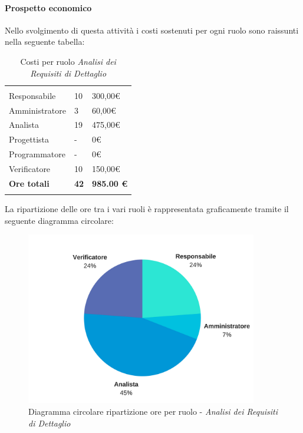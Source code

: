 			\paragraph{Prospetto economico} \Spazio
			Nello svolgimento di questa attività i costi sostenuti per ogni ruolo sono raissunti nella seguente tabella:
			\begin{table}[H]
			\centering
			\begin{tabular}{|p{4cm}|C{4cm}|C{4cm}|}
				
				 & &\\
				Responsabile & 10 & 300,00\euro \\
				\hline
				Amministratore& 3 & 60,00\euro \\
				\hline
				Analista & 19 & 475,00\euro \\
				\hline
				Progettista & - & 0\euro \\
				\hline
				Programmatore & - & 0\euro \\
				\hline
				Verificatore & 10 & 150,00\euro \\
				\hline
				\textbf{Ore totali} & \textbf{42} & \textbf{985.00 \euro} \\
			\end{tabular}
			\caption{Costi per ruolo \textit{Analisi dei Requisiti di Dettaglio}}
		\end{table}
		
		La ripartizione delle ore tra i vari ruoli è rappresentata graficamente tramite il seguente diagramma circolare:

			\begin{figure}[H] 
			\centering 
			\includegraphics[width=0.9\textwidth]{images/CircolareAnalisiRequisitiDiDettaglio.png} 
			\caption{Diagramma circolare ripartizione ore per ruolo - \textit{Analisi dei Requisiti di Dettaglio}}
			\label{CircolareAnalisiRequisitiDiDettaglio}
			\end{figure}
		


